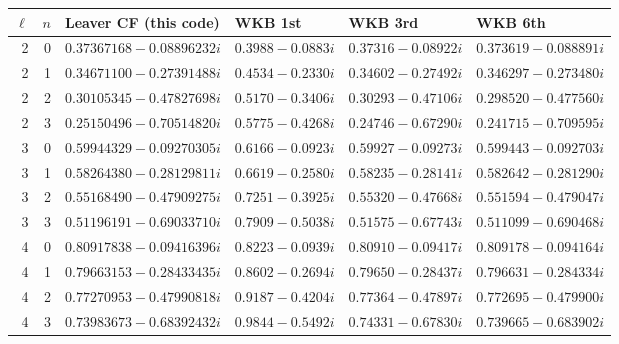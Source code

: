 \begin{tabular}{rrllll}\toprule
$\ell$ & $n$ & Leaver CF (this code) & WKB 1st & WKB 3rd & WKB 6th\\\midrule
2 & 0 & $0.37367168-0.08896232i$ & $0.3988-0.0883i$ & $0.37316-0.08922i$ & $0.373619-0.088891i$ \\
2 & 1 & $0.34671100-0.27391488i$ & $0.4534-0.2330i$ & $0.34602-0.27492i$ & $0.346297-0.273480i$ \\
2 & 2 & $0.30105345-0.47827698i$ & $0.5170-0.3406i$ & $0.30293-0.47106i$ & $0.298520-0.477560i$ \\
2 & 3 & $0.25150496-0.70514820i$ & $0.5775-0.4268i$ & $0.24746-0.67290i$ & $0.241715-0.709595i$ \\
3 & 0 & $0.59944329-0.09270305i$ & $0.6166-0.0923i$ & $0.59927-0.09273i$ & $0.599443-0.092703i$ \\
3 & 1 & $0.58264380-0.28129811i$ & $0.6619-0.2580i$ & $0.58235-0.28141i$ & $0.582642-0.281290i$ \\
3 & 2 & $0.55168490-0.47909275i$ & $0.7251-0.3925i$ & $0.55320-0.47668i$ & $0.551594-0.479047i$ \\
3 & 3 & $0.51196191-0.69033710i$ & $0.7909-0.5038i$ & $0.51575-0.67743i$ & $0.511099-0.690468i$ \\
4 & 0 & $0.80917838-0.09416396i$ & $0.8223-0.0939i$ & $0.80910-0.09417i$ & $0.809178-0.094164i$ \\
4 & 1 & $0.79663153-0.28433435i$ & $0.8602-0.2694i$ & $0.79650-0.28437i$ & $0.796631-0.284334i$ \\
4 & 2 & $0.77270953-0.47990818i$ & $0.9187-0.4204i$ & $0.77364-0.47897i$ & $0.772695-0.479900i$ \\
4 & 3 & $0.73983673-0.68392432i$ & $0.9844-0.5492i$ & $0.74331-0.67830i$ & $0.739665-0.683902i$ \\
\bottomrule\end{tabular}
